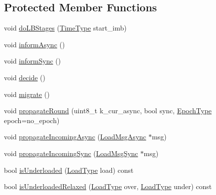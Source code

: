 \subsection*{Protected Member Functions}
\begin{DoxyCompactItemize}
\item 
void \hyperlink{structvt_1_1vrt_1_1collection_1_1lb_1_1_tempered_l_b_a164fa3ad3c312adccd059e3b64e39e8d}{do\+L\+B\+Stages} (\hyperlink{namespacevt_a876a9d0cd5a952859c72de8a46881442}{Time\+Type} start\+\_\+imb)
\item 
void \hyperlink{structvt_1_1vrt_1_1collection_1_1lb_1_1_tempered_l_b_a316b422988867cdebad99c23d23f27ce}{inform\+Async} ()
\item 
void \hyperlink{structvt_1_1vrt_1_1collection_1_1lb_1_1_tempered_l_b_af06bd756568787d47ecded79576dc145}{inform\+Sync} ()
\item 
void \hyperlink{structvt_1_1vrt_1_1collection_1_1lb_1_1_tempered_l_b_a099523e70a588de77eec53a36aeeecdf}{decide} ()
\item 
void \hyperlink{structvt_1_1vrt_1_1collection_1_1lb_1_1_tempered_l_b_a59049101eba58eb9206606c25952bd2d}{migrate} ()
\item 
void \hyperlink{structvt_1_1vrt_1_1collection_1_1lb_1_1_tempered_l_b_a2050cb21d8142439eb1c29915e25b934}{propagate\+Round} (uint8\+\_\+t k\+\_\+cur\+\_\+async, bool sync, \hyperlink{namespacevt_a985a5adf291c34a3ca263b3378388236}{Epoch\+Type} epoch=no\+\_\+epoch)
\item 
void \hyperlink{structvt_1_1vrt_1_1collection_1_1lb_1_1_tempered_l_b_a15dd6de3c9fe1998dae4bc685c991bb5}{propagate\+Incoming\+Async} (\hyperlink{structvt_1_1vrt_1_1collection_1_1lb_1_1_tempered_l_b_a38d9ad7e92612cdbdf564b6f49b516a7}{Load\+Msg\+Async} $\ast$msg)
\item 
void \hyperlink{structvt_1_1vrt_1_1collection_1_1lb_1_1_tempered_l_b_ab754acaf5c76886c1e61ce4f4c69b1cb}{propagate\+Incoming\+Sync} (\hyperlink{structvt_1_1vrt_1_1collection_1_1lb_1_1_tempered_l_b_aa46eb8cbc4c505f35b970f75e38b5e0d}{Load\+Msg\+Sync} $\ast$msg)
\item 
bool \hyperlink{structvt_1_1vrt_1_1collection_1_1lb_1_1_tempered_l_b_a499b448496764b6eb8c25f3dc8188e2c}{is\+Underloaded} (\hyperlink{structvt_1_1vrt_1_1collection_1_1lb_1_1_base_l_b_a215e22b9f12678303f49615ae3be05cc}{Load\+Type} load) const
\item 
bool \hyperlink{structvt_1_1vrt_1_1collection_1_1lb_1_1_tempered_l_b_a9a65a386b0dbd2006db3977ecf0efe79}{is\+Underloaded\+Relaxed} (\hyperlink{structvt_1_1vrt_1_1collection_1_1lb_1_1_base_l_b_a215e22b9f12678303f49615ae3be05cc}{Load\+Type} over, \hyperlink{structvt_1_1vrt_1_1collection_1_1lb_1_1_base_l_b_a215e22b9f12678303f49615ae3be05cc}{Load\+Type} under) const

\end{DoxyCompactItemize}
